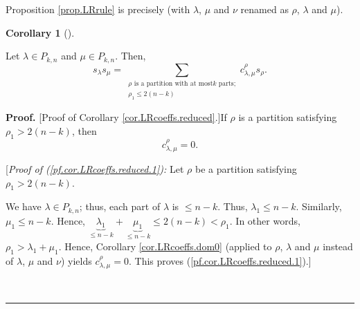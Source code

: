 \documentclass[numbers=enddot,12pt,final,onecolumn,notitlepage]{scrartcl}%
\theoremstyle{definition}
\newtheorem{coro}[theo]{Corollary}
\newenvironment{corollary}[1][]
{\begin{coro}[#1]\begin{leftbar}}
{\end{leftbar}\end{coro}}
\newenvironment{proof}[1][Proof]{\noindent\textbf{#1.} }{\ \rule{0.5em}{0.5em}}
\let\sumnonlimits\sum
\renewcommand{\sum}{\sumnonlimits\limits}
\begin{document}
Proposition \ref{prop.LRrule} is precisely \cite[(2.5.6)]{GriRei18} (with
$\lambda$, $\mu$ and $\nu$ renamed as $\rho$, $\lambda$ and $\mu$).

\begin{corollary}
\label{cor.LRcoeffs.reduced}Let $\lambda\in P_{k,n}$ and $\mu\in P_{k,n}$.
Then,%
\[
s_{\lambda}s_{\mu}=\sum_{\substack{\rho\text{ is a partition with at most
}k\text{ parts;}\\\rho_{1}\leq2\left(  n-k\right)  }}c_{\lambda,\mu}^{\rho
}s_{\rho}.
\]

\end{corollary}

\begin{proof}
[Proof of Corollary \ref{cor.LRcoeffs.reduced}.]If $\rho$ is a partition
satisfying $\rho_{1}>2\left(  n-k\right)  $, then%
\begin{equation}
c_{\lambda,\mu}^{\rho}=0. \label{pf.cor.LRcoeffs.reduced.1}%
\end{equation}


[\textit{Proof of (\ref{pf.cor.LRcoeffs.reduced.1}):} Let $\rho$ be a
partition satisfying $\rho_{1}>2\left(  n-k\right)  $.

We have $\lambda\in P_{k,n}$; thus, each part of $\lambda$ is $\leq n-k$.
Thus, $\lambda_{1}\leq n-k$. Similarly, $\mu_{1}\leq n-k$. Hence,
$\underbrace{\lambda_{1}}_{\leq n-k}+\underbrace{\mu_{1}}_{\leq n-k}%
\leq2\left(  n-k\right)  <\rho_{1}$. In other words, $\rho_{1}>\lambda_{1}%
+\mu_{1}$. Hence, Corollary \ref{cor.LRcoeffs.dom0} (applied to $\rho$,
$\lambda$ and $\mu$ instead of $\lambda$, $\mu$ and $\nu$) yields
$c_{\lambda,\mu}^{\rho}=0$. This proves (\ref{pf.cor.LRcoeffs.reduced.1}).]


\end{proof}
\end{document}

